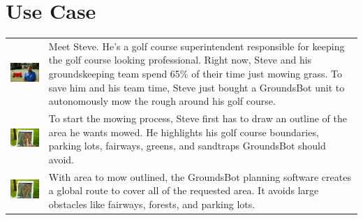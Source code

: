 \documentclass[12pt]{extarticle}
\begin{document}
\section{Use Case}
\begin{table}[H]
  \def\arraystretch{4}
   \setlength\tabcolsep{8pt}


\begin{tabularx}{\textwidth}{cX}
\includegraphics[width=6cm, valign=t]{usecase1_1.png} & 
Meet Steve.  He's a golf course superintendent responsible for keeping the golf course looking professional.  Right now, Steve and his groundskeeping team spend 65\% of their time just mowing grass.  To save him and his team time, Steve just bought a GroundsBot unit to autonomously mow the rough around his golf course. \\
\includegraphics[width=6cm, valign=t]{usecase1_2.png} &
To start the mowing process, Steve first has to draw an outline of the area he wants mowed.  He highlights his golf course boundaries, parking lots, fairways, greens, and sandtraps GroundsBot should avoid.
\\
\includegraphics[width=6cm, valign=t]{usecase1_3.png} &
With area to mow outlined, the GroundsBot planning software creates a global route to cover all of the requested area.  It avoids large obstacles like fairways, forests, and parking lots.

\end{tabularx}
\end{table}
\end{document}
